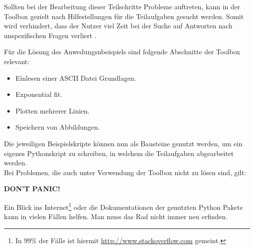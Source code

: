 \documentclass[a4paper,fleqn]{article}
\begin{document}
Sollten bei der Bearbeitung dieser Teilschritte Probleme auftreten, kann in der
Toolbox gezielt nach Hilfestellungen für die Teilaufgaben gesucht werden. Somit
wird verhindert, dass der Nutzer viel Zeit bei der Suche auf Antworten nach
unspezifischen Fragen verliert .

\newpage

Für die Lösung des Anwedungsnbeispiels sind folgende Abschnitte der Toolbox
relevant:

\begin{itemize}
  \item Einlesen einer ASCII Datei Grundlagen.
  \item Exponential fit.
  \item Plotten mehrerer Linien.
  \item Speichern von Abbildungen.
\end{itemize}

Die jeweiligen Beispielskripte können nun als Bausteine genutzt werden, um ein
eigenes Pythonskript zu schreiben, in welchem die Teilaufgaben abgearbeitet
werden.\\

Bei Problemen, die auch unter Verwendung der Toolbox nicht zu lösen sind, gilt:

\begin{center}
  \textbf{DON'T PANIC!}
\end{center}

Ein Blick ins Internet\footnote{In 99\% der Fälle ist hiermit
\url{http://www.stackoverflow.com} gemeint.} oder die Dokumentationen der
genutzten Python Pakete kann in vielen Fällen helfen.  Man muss das Rad nicht
immer neu erfinden.

\end{document}
